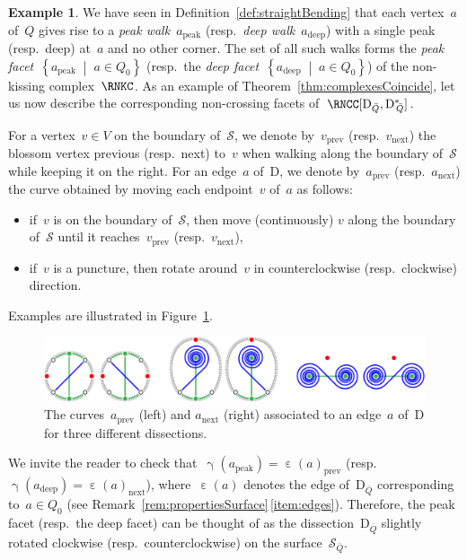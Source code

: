 \documentclass{amsart}
\theoremstyle{definition}
\newtheorem{example}[theorem]{Example}
\newcommand{\set}[2]{\left\{ #1 \;\middle|\; #2 \right\}} %
\newcommand{\fref}[1]{Figure~\ref{#1}} %
\newcommand{\darkblue}{\color{darkblue}} %
\newcommand{\defn}[1]{\textsl{\darkblue #1}} %
\newcommand{\peak}{\mathrm{peak}} %
\newcommand{\deep}{\mathrm{deep}} %
\newcommand{\surface}{\mathcal{S}} %
\newcommand{\dual}{^*} %
\newcommand{\dissection}{\mathrm{D}} %
\newcommand{\curveof}{\operatorname{\gamma}} %
\newcommand{\edgeof}{\operatorname{\varepsilon}} %
\newcommand{\vnext}[1]{#1_{\operatorname{next}}} %
\newcommand{\vprevious}[1]{#1_{\operatorname{prev}}} %
\begin{document}
\begin{example}
\label{exm:peakDeepFacets}
We have seen in Definition~\ref{def:straightBending} that each vertex~$a$ of~$Q$ gives rise to a \defn{peak walk}~$a_\peak$ (resp.~\defn{deep walk}~$a_\deep$) with a single peak (resp.~deep) at~$a$ and no other corner.
The set of all such walks forms the \defn{peak facet}~$\set{a_\peak}{a \in Q_0}$ (resp.~the \defn{deep facet}~$\set{a_\deep}{a \in Q_0}$) of the non-kissing complex~$\RNKC$.
As an example of Theorem~\ref{thm:complexesCoincide}, let us now describe the corresponding non-crossing facets of~$\RNCC[\dissection_{\bar Q}, {{\dissection\dual}\!\!_{\bar Q}}]$.


For a vertex~$v \in V$ on the boundary of~$\surface$, we denote by~$\vprevious{v}$ (resp.~$\vnext{v}$) the blossom vertex previous (resp.~next) to~$v$ when walking along  the boundary of~$\surface$ while keeping it on the right.
For an edge~$a$ of~$\dissection$, we denote by~$\vprevious{a}$ (resp.~$\vnext{a}$) the curve obtained by moving each endpoint~$v$ of~$a$ as follows:
\begin{itemize}
\item if~$v$ is on the boundary of~$\surface$, then move (continuously) $v$ along the boundary of~$\surface$ until it reaches~$\vprevious{v}$ (resp.~$\vnext{v}$),
\item if~$v$ is a puncture, then rotate around~$v$ in counterclockwise (resp.~clockwise) direction.
\end{itemize}
Examples are illustrated in \fref{fig:peakDeep}.
%
\begin{figure}[h]
	\capstart
	\centerline{\includegraphics[scale=.7]{peakDeep}}
	\caption{The curves~$\vprevious{a}$ (left) and $\vnext{a}$ (right) associated to an edge~$a$ of~$\dissection$ for three different dissections.}
	\label{fig:peakDeep}
\end{figure}

We invite the reader to check that~$\curveof(a_\peak) = \vprevious{\edgeof(a)}$ (resp.~$\curveof(a_\deep) = \vnext{\edgeof(a)}$), where~$\edgeof(a)$ denotes the edge of~$\dissection_{\bar Q}$ corresponding to~$a \in Q_0$ (see Remark~\ref{rem:propertiesSurface}\,\eqref{item:edges}).
Therefore, the peak facet (resp.~the deep facet) can be thought of as the dissection~$\dissection_{\bar Q}$ slightly rotated clockwise (resp.~counterclockwise) on the surface~$\surface_{\bar Q}$.
\end{example}
\end{document}
